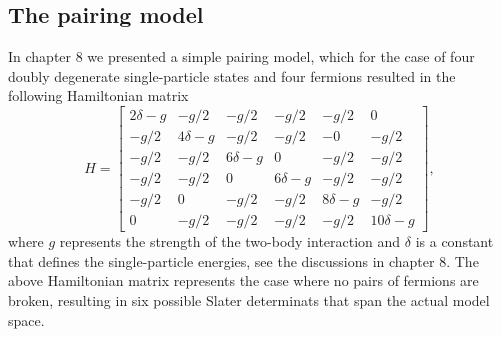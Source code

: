 \subsection{The pairing model}
In chapter 8 we presented a simple pairing model, which for the case of four doubly degenerate single-particle states and 
four fermions resulted in the following Hamiltonian matrix
 \[
  H = \begin{bmatrix}
  2\delta -g & -g/2 & -g/2 & -g/2 & -g/2 & 0 \\ -g/2 & 4\delta -g &
  -g/2 & -g/2 & -0 & -g/2 \\ -g/2 & -g/2 & 6\delta -g & 0 & -g/2 &
  -g/2 \\ -g/2 & -g/2 & 0 & 6\delta-g & -g/2 & -g/2 \\ -g/2 & 0 & -g/2
  & -g/2 & 8\delta-g & -g/2 \\ 0 & -g/2 & -g/2 & -g/2 & -g/2 &
  10\delta -g
  \end{bmatrix},
  \]
where $g$ represents the strength of the two-body interaction and $\delta$ is a constant that defines the single-particle energies, see the discussions in chapter 8.  The above Hamiltonian matrix represents the case where no pairs of fermions are broken, resulting in six possible Slater determinats that span the actual model space.

